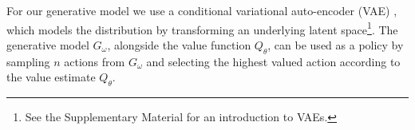 \documentclass{article}
\newcommand{\e}{\epsilon}
\newcommand{\ta}{\theta}
\newcommand{\w}{\omega}
\newcommand{\N}{\mathcal{N}}
\newcommand{\B}{\mathcal{B}}
\DeclareMathOperator*{\argmin}{argmin}
\begin{document}

For our generative model we use a conditional variational auto-encoder (VAE) \citep{kingma2013auto, sohn2015learning}, which models the distribution by transforming an underlying latent space\footnote{See the Supplementary Material for an introduction to VAEs.}. 
The generative model $G_\w$, alongside the value function $Q_\ta$, can be used as a policy by sampling $n$ actions from $G_\w$ and selecting the highest valued action according to the value estimate $Q_\ta$. 
\end{document}
